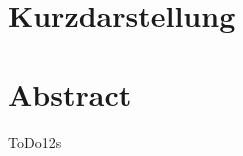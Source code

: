 \thispagestyle{empty}
\section*{Kurzdarstellung}
\label{sec:kurzdarstellung}

\blindtext


\section*{Abstract}
\label{sec:abstract}

ToDo12s
